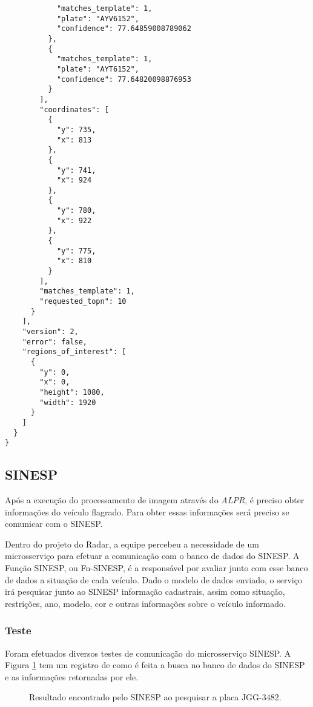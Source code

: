 \begin{lstlisting}
            "matches_template": 1,
            "plate": "AYV6152",
            "confidence": 77.64859008789062
          },
          {
            "matches_template": 1,
            "plate": "AYT6152",
            "confidence": 77.64820098876953
          }
        ],
        "coordinates": [
          {
            "y": 735,
            "x": 813
          },
          {
            "y": 741,
            "x": 924
          },
          {
            "y": 780,
            "x": 922
          },
          {
            "y": 775,
            "x": 810
          }
        ],
        "matches_template": 1,
        "requested_topn": 10
      }
    ],
    "version": 2,
    "error": false,
    "regions_of_interest": [
      {
        "y": 0,
        "x": 0,
        "height": 1080,
        "width": 1920
      }
    ]
  }
}
\end{lstlisting}


\subsection{SINESP}

Após a execução do processamento de imagem através do \textit{ALPR}, é preciso obter informações do veículo flagrado. Para obter essas informações será preciso se comunicar com o SINESP.

Dentro do projeto do Radar, a equipe percebeu a necessidade de um microsserviço para efetuar a comunicação com o banco de dados do SINESP. A Função SINESP, ou Fn-SINESP, é a responsável por avaliar junto com esse banco de dados a situação de cada veículo. Dado o modelo de dados enviado, o serviço irá pesquisar junto ao SINESP informação cadastrais, assim como situação, restrições, ano, modelo, cor e outras informações sobre o veículo informado.

\subsubsection{Teste}

Foram efetuados diversos testes de comunicação do microsserviço SINESP. A Figura \ref{fig:sinesp} tem um registro de como é feita a busca no banco de dados do SINESP e as informações retornadas por ele.

\begin{figure}[!h]
	\caption{\label{fig:sinesp} Resultado encontrado pelo SINESP ao pesquisar a placa JGG-3482.}
\end{figure}


